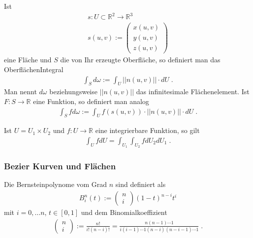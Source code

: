 \begin{Definition}
Ist 
\begin{align*}
s: U \subset \mathbb{R}^2 \to \mathbb{R}^3 \\
s(u,v) := \begin{pmatrix} x(u,v) \\ y(u,v) \\ z(u,v) \end{pmatrix} 
\end{align*} 
eine Fläche und $S$ die von Ihr erzeugte Oberfläche, so definiert man  das OberflächenIntegral
\begin{align*}
\int_S d \omega:= \int_U ||n(u,v)|| \cdot dU \;.
\end{align*} 
Man nennt $d \omega$ beziehungsweise $ ||n(u,v)||$ das infinitesimale Flächenelement.
Ist $F: S \to \mathbb{R}$ eine Funktion, so definiert man analog
\begin{align*}
\int_S f d \omega:= \int_U f(s(u,v)) \cdot ||n(u,v)|| \cdot dU \;.
\end{align*} 
\end{Definition}

\begin{Satz}
Ist $U = U_1 \times U_2$ und $f: U \to \mathbb{R}$ eine integrierbare Funktion, so gilt
\begin{align*}
\int_U f dU = \int_{U_1} \int_{U_2} f  dU_2 dU_1 \;.
\end{align*} 
\end{Satz}

\subsubsection{Bezier Kurven und Flächen}
\begin{Definition}
Die Bernsteinpolynome vom Grad $n$ sind definiert als
\begin{align*}
B_i^n(t) := \begin{pmatrix} n \\ i \end{pmatrix} (1-t)^{n-i}t^i
\end{align*}
mit $i = 0, \hdots n$, $t \in [0,1]$ und dem Binomialkoeffizient
\begin{align*}
\begin{pmatrix} n \\ i \end{pmatrix} := \frac{n!}{i!(n-i)!} = \frac{n(n-1) \cdots 1}{i(i-1) \cdots 1 (n-i) (n-i-1) \cdots 1 } \; .
\end{align*}
\end{Definition}

